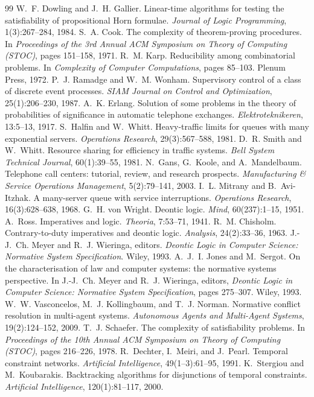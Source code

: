\documentclass[11pt,a4paper]{article}
\begin{document}
\begin{thebibliography}{99}
 W.~F. Dowling and J.~H. Gallier. Linear-time algorithms for testing the satisfiability of propositional Horn
formulae. \emph{Journal of Logic Programming}, 1(3):267--284, 1984.
 S.~A. Cook. The complexity of theorem-proving procedures. In \emph{Proceedings of the 3rd Annual ACM Symposium
on Theory of Computing (STOC)}, pages 151--158, 1971.
 R.~M. Karp. Reducibility among combinatorial problems. In \emph{Complexity of Computer Computations}, pages
85--103. Plenum Press, 1972.
 P.~J. Ramadge and W.~M. Wonham. Supervisory control of a class of discrete event processes. \emph{SIAM Journal
on Control and Optimization}, 25(1):206--230, 1987.
 A.~K. Erlang. Solution of some problems in the theory of probabilities of significance in automatic
telephone exchanges. \emph{Elektroteknikeren}, 13:5--13, 1917.
 S.~Halfin and W.~Whitt. Heavy-traffic limits for queues with many exponential servers. \emph{Operations
Research}, 29(3):567--588, 1981.
 D.~R. Smith and W.~Whitt. Resource sharing for efficiency in traffic systems. \emph{Bell System Technical
Journal}, 60(1):39--55, 1981.
 N.~Gans, G.~Koole, and A.~Mandelbaum. Telephone call centers: tutorial, review, and research prospects.
\emph{Manufacturing \& Service Operations Management}, 5(2):79--141, 2003.
 I.~L. Mitrany and B.~Avi-Itzhak. A many-server queue with service interruptions. \emph{Operations Research},
16(3):628--638, 1968.
 G.~H. von Wright. Deontic logic. \emph{Mind}, 60(237):1--15, 1951.
 A.~Ross. Imperatives and logic. \emph{Theoria}, 7:53--71, 1941.
 R.~M. Chisholm. Contrary-to-duty imperatives and deontic logic. \emph{Analysis}, 24(2):33--36, 1963.
 J.-J.~Ch. Meyer and R.~J. Wieringa, editors. \emph{Deontic Logic in Computer Science: Normative System
Specification}. Wiley, 1993.
 A.~J.~I. Jones and M.~Sergot. On the characterisation of law and computer systems: the normative systems
perspective. In J.-J.~Ch. Meyer and R.~J. Wieringa, editors, \emph{Deontic Logic in Computer Science: Normative System
Specification}, pages 275--307. Wiley, 1993.
 W.~W. Vasconcelos, M.~J. Kollingbaum, and T.~J. Norman. Normative conflict resolution in multi-agent systems.
\emph{Autonomous Agents and Multi-Agent Systems}, 19(2):124--152, 2009.
 T.~J. Schaefer. The complexity of satisfiability problems. In \emph{Proceedings of the 10th Annual ACM
Symposium on Theory of Computing (STOC)}, pages 216--226, 1978.
 R.~Dechter, I.~Meiri, and J.~Pearl. Temporal constraint networks. \emph{Artificial Intelligence},
49(1--3):61--95, 1991.
 K.~Stergiou and M.~Koubarakis. Backtracking algorithms for disjunctions of temporal constraints.
\emph{Artificial Intelligence}, 120(1):81--117, 2000.
\end{thebibliography}
\end{document}
